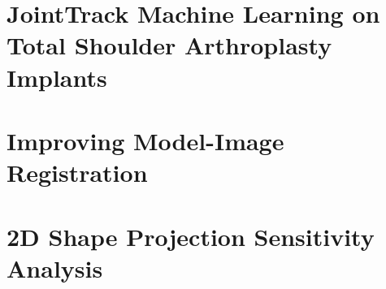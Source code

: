 \section{JointTrack Machine Learning on Total Shoulder Arthroplasty Implants}

\section{Improving Model-Image Registration}
\label{sec:new-image-metrics}

\section{2D Shape Projection Sensitivity Analysis}
\label{sec:shape-sensitivity}



